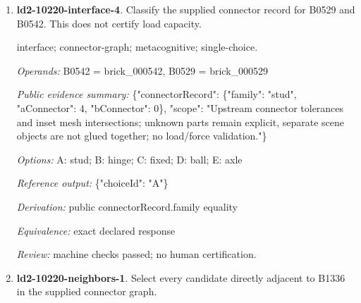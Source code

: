 \begin{enumerate}
\par{\small interface; connector-graph; metacognitive; single-choice.\par\textit{Operands:} B0491 = brick\_000491, B0492 = brick\_000492\par\textit{Public evidence summary:} \{"connectorRecord": \{"family": "hinge", "aConnector": 1, "bConnector": 2\}, "scope": "Upstream connector tolerances and inset mesh intersections; unknown parts remain explicit, separate scene objects are not glued together; no load/force validation."\}\par\textit{Options:} A: fixed; B: axle; C: ball; D: stud; E: hinge\par\textit{Reference output:} \{"choiceId": "E"\}\par\textit{Derivation:} public connectorRecord.family equality\par\textit{Equivalence:} exact declared response\par\textit{Review:} machine checks passed; no human certification.}
\item \textbf{ld2-10220-interface-4}. Classify the supplied connector record for B0529 and B0542. This does not certify load capacity.
\par{\small interface; connector-graph; metacognitive; single-choice.\par\textit{Operands:} B0542 = brick\_000542, B0529 = brick\_000529\par\textit{Public evidence summary:} \{"connectorRecord": \{"family": "stud", "aConnector": 4, "bConnector": 0\}, "scope": "Upstream connector tolerances and inset mesh intersections; unknown parts remain explicit, separate scene objects are not glued together; no load/force validation."\}\par\textit{Options:} A: stud; B: hinge; C: fixed; D: ball; E: axle\par\textit{Reference output:} \{"choiceId": "A"\}\par\textit{Derivation:} public connectorRecord.family equality\par\textit{Equivalence:} exact declared response\par\textit{Review:} machine checks passed; no human certification.}
\item \textbf{ld2-10220-neighbors-1}. Select every candidate directly adjacent to B1336 in the supplied connector graph.

\end{enumerate}
